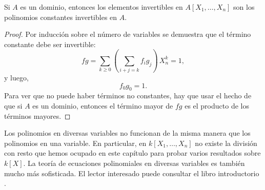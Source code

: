 \begin{proposicion}
  \label{prop:A[X1...Xn]-elementos-invertibles}
  Si $A$ es un dominio, entonces los elementos invertibles en
  $A [X_1,\ldots,X_n]$ son los polinomios constantes invertibles en $A$.

  \begin{proof}
    Por inducción sobre el número de variables se demuestra que el término
    constante debe ser invertible:
    $$fg = \sum_{k\ge 0} \left(\sum_{i+j = k} f_i g_j\right)\,X_n^k = 1,$$
    y luego,
    $$f_0 g_0 = 1.$$
    Para ver que no puede haber términos no constantes, hay que usar el hecho de
    que si $A$ es un dominio, entonces el término mayor de $fg$ es el producto
    de los términos mayores.
  \end{proof}
\end{proposicion}

Los polinomios en diversas variables no funcionan de la misma manera que
los polinomios en una variable. En particular, en $k [X_1,\ldots,X_n]$ no existe
la división con resto que hemos ocupado en este capítulo para probar varios
resultados sobre $k [X]$. La teoría de ecuaciones polinomiales en diversas
variables es también mucho más sofisticada. El lector interesado puede consultar
el libro introductorio \cite{Cox-Little-OShea-intro}.
